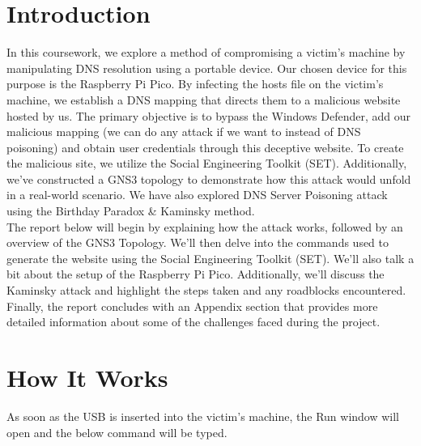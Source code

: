 \documentclass[11pt]{report}
\begin{document}
\section*{Introduction}

In this coursework, we explore a method of compromising a victim's machine by
manipulating DNS resolution using a portable device. Our chosen device for this
purpose is the Raspberry Pi Pico. By infecting the hosts file on the victim's
machine, we establish a DNS mapping that directs them to a malicious website
hosted by us. The primary objective is to bypass the Windows Defender, add our
malicious mapping (we can do any attack if we want to instead of DNS poisoning)
and obtain user credentials through this deceptive website. To create the
malicious site, we utilize the Social Engineering Toolkit (SET). Additionally,
we've constructed a GNS3 topology to demonstrate how this attack would unfold
in a real-world scenario. We have also explored DNS Server Poisoning attack
using the Birthday Paradox \& Kaminsky method.
\\[0.5em]
The report below will begin by explaining how the attack works, followed by an
overview of the GNS3 Topology. We'll then delve into the commands used to
generate the website using the Social Engineering Toolkit (SET). We'll also
talk a bit about the setup of the Raspberry Pi Pico. Additionally, we'll
discuss the Kaminsky attack and highlight the steps taken and any roadblocks
encountered. Finally, the report concludes with an Appendix section that
provides more detailed information about some of the challenges faced during
the project.

\section*{How It Works}
As soon as the USB is inserted into the victim's machine, the Run window will open and the below command will be typed.  
\end{document}
